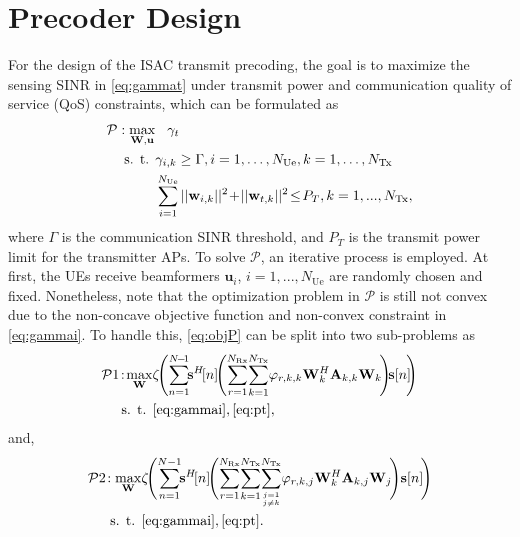 \documentclass[conference,twocolumn,a4paper]{IEEEtran}
\theoremstyle{remark} \newtheorem{remark}{Remark}
\begin{document}
\section{Precoder Design}
For the design of the ISAC transmit precoding, the goal is to maximize the sensing SINR in \eqref{eq:gammat} under transmit power and communication quality of service (QoS) constraints, which can be formulated as
\begin{subequations}
\begin{align}
\mathcal{P}: \max_{\mathbf{W},\mathbf{u}} &  \hspace{3mm}\gamma_t \label{eq:objP}\\
\text { s. t. } & \gamma_{i,k} \geq \Gamma, i=1, \ldots, N_{\mathrm{Ue}}, k=1, \ldots, N_{\mathrm{Tx}}\label{eq:gammai}\\
& \sum_{i=1}^{N_{\mathrm{Ue}}}||\mathbf{w}_{i,k}||^2\!+\!||\mathbf{w}_{t,k}||^2\!\leq \!P_T, k=1,...,N_{\mathrm{Tx}},\label{eq:pt}
\end{align}
\end{subequations}
where $\Gamma$ is the communication SINR threshold, and $P_T$ is the transmit power limit for the transmitter APs. To solve $\mathcal{P}$, an iterative process is employed. At first, the UEs receive beamformers $\mathbf{u}_i$, $i$$=$$1,...,N_{\mathrm{Ue}}$ are randomly chosen and fixed. Nonetheless, note that the optimization problem in $\mathcal{P}$ is still not convex due to the non-concave objective function and non-convex constraint in \eqref{eq:gammai}. To handle this, \eqref{eq:objP} can be split into two sub-problems as
\begin{subequations}
\begin{align}
\mathcal{P}1\!:\! \max_{\mathbf{W}} &\zeta\!\Bigg(\!\sum_{n=1}^{N\!-\!1}\!\!\mathbf{s}^H\![n]\!\Bigg(\!\sum_{r=1}^{N_{\mathrm{Rx}}}\! \sum_{k=1}^{N_{\mathrm{Tx}}}\! \varphi_{r,k,k}\mathbf{W}_k^H\mathbf{A}_{k,k}\mathbf{W}_k\!\Bigg)\!\mathbf{s}[n]\!\!\Bigg)\label{eq:p1}\\
\text { s. t. } & \eqref{eq:gammai}, \eqref{eq:pt},\nonumber 
\end{align}
\end{subequations}
and, 
\begin{subequations}
\begin{align}
\mathcal{P}2\!: \max_{\mathbf{W}} &\zeta\!\Bigg(\!\sum_{n=1}^{N-1}\!\!\mathbf{s}^H\![n]\!\Bigg(\!\sum_{r=1}^{N_{\mathrm{Rx}}}\! \sum_{k=1}^{N_{\mathrm{Tx}}}\! \sum_{j=1 \atop j \neq k}^{N_{\mathrm{Tx}}}\! \varphi_{r,k,j}\mathbf{W}_k^H\mathbf{A}_{k,j}\mathbf{W}_j\!\Bigg) \mathbf{s}[n]\!\Bigg)\label{eq:p2}\\
\text { s. t. } & \eqref{eq:gammai},\eqref{eq:pt}.\nonumber 
\end{align}
\end{subequations}
\end{document}
